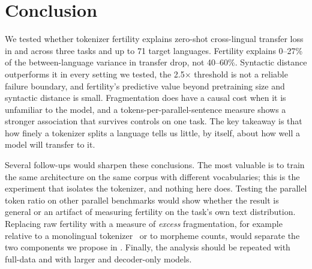 \section{Conclusion}
\label{sec:conclusion}

We tested whether tokenizer fertility explains zero-shot cross-lingual transfer loss in \mbert and \xlmr across three tasks and up to 71 target languages.
Fertility explains 0--27\% of the between-language variance in transfer drop, not 40--60\%.
Syntactic distance outperforms it in every setting we tested, the 2.5$\times$ threshold is not a reliable failure boundary, and fertility's predictive value beyond pretraining size and syntactic distance is small.
Fragmentation does have a causal cost when it is unfamiliar to the model, and a tokens-per-parallel-sentence measure shows a stronger association that survives controls on one task.
The key takeaway is that how finely a tokenizer splits a language tells us little, by itself, about how well a model will transfer to it.

Several follow-ups would sharpen these conclusions.
The most valuable is to train the same architecture on the same corpus with different vocabularies; this is the experiment that isolates the tokenizer, and nothing here does.
Testing the parallel token ratio on other parallel benchmarks would show whether the \sib result is general or an artifact of measuring fertility on the task's own text distribution.
Replacing raw fertility with a measure of \emph{excess} fragmentation, for example relative to a monolingual tokenizer~\cite{rust2021good} or to morpheme counts, would separate the two components we propose in .
Finally, the analysis should be repeated with full-data \xnli and with larger and decoder-only models.
